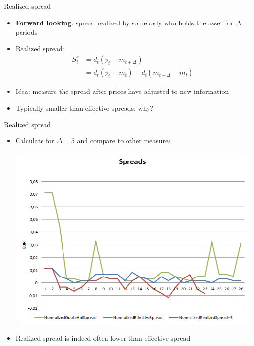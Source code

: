 \begin{frame}{Realized spread}
	\begin{itemize}
		\item \textbf{Forward looking}: spread realized by somebody who holds the asset for $\Delta$ periods
		\item \alert{Realized spread}:
		\begin{align*}
		S^r_t & = d_t(p_t - m_{t+\Delta}) \\
		& = d_t(p_t-m_t) - d_t(m_{t+\Delta}-m_t)
		\end{align*}
		\item Idea: measure the spread after prices have adjusted to new information
		\item Typically smaller than effective spreads: why?
	\end{itemize}
\end{frame}


\begin{frame}{Realized spread}
	\begin{itemize}
		\item Calculate for $\Delta=5$ and compare to other measures
		\begin{center}
			\includegraphics[scale=0.39]{pics/L2_realizedspread}
		\end{center}
		\item Realized spread is indeed often lower than effective spread
	\end{itemize}
\end{frame}


